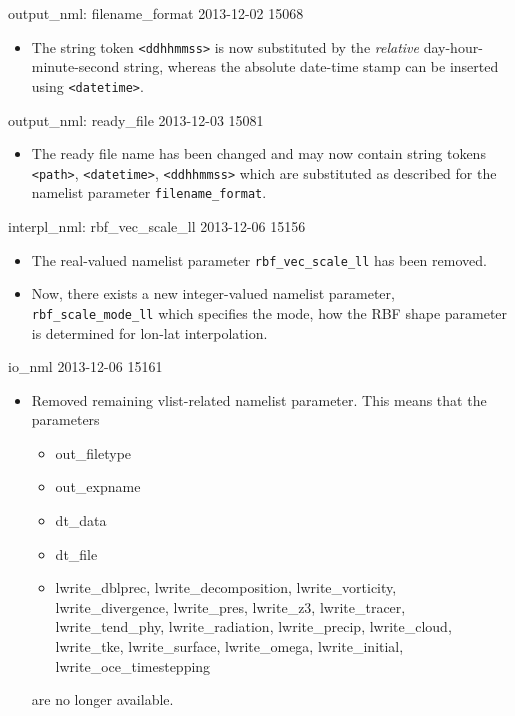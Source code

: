 \begin{changeitem}{output\_nml: filename\_format }{ 2013-12-02 }{ 15068 }
  \begin{itemize}
   \item The string token \texttt{<ddhhmmss>} is now substituted by the \emph{relative} day-hour-minute-second
         string, whereas the absolute date-time stamp can be inserted using \texttt{<datetime>}.
  \end{itemize}
\end{changeitem}

\begin{changeitem}{output\_nml: ready\_file }{ 2013-12-03 }{ 15081 }
  \begin{itemize}
   \item The ready file name has been changed and may now contain
     string tokens \texttt{<path>}, \texttt{<datetime>},
     \texttt{<ddhhmmss>} which are substituted as described for the
     namelist parameter \texttt{filename\_format}.
  \end{itemize}
\end{changeitem}

\begin{changeitem}{interpl\_nml: rbf\_vec\_scale\_ll }{ 2013-12-06 }{ 15156 }
  \begin{itemize}
   \item The real-valued namelist parameter \texttt{rbf\_vec\_scale\_ll} has been removed.
   \item Now, there exists a new integer-valued namelist parameter, \texttt{rbf\_scale\_mode\_ll}
         which specifies the mode, how the RBF shape parameter is
         determined for lon-lat interpolation.
  \end{itemize}
\end{changeitem}

\begin{changeitem}{io\_nml }{ 2013-12-06 }{ 15161 }
  \begin{itemize}
   \item Removed remaining vlist-related namelist parameter. This means that the parameters
         \begin{itemize}
            \item out\_filetype
            \item out\_expname
            \item dt\_data
            \item dt\_file
            \item lwrite\_dblprec, lwrite\_decomposition, lwrite\_vorticity, lwrite\_divergence, lwrite\_pres, 
                  lwrite\_z3, lwrite\_tracer, lwrite\_tend\_phy, lwrite\_radiation, lwrite\_precip, lwrite\_cloud, 
                  lwrite\_tke, lwrite\_surface, lwrite\_omega, lwrite\_initial, lwrite\_oce\_timestepping
         \end{itemize}
         are no longer available.
  \end{itemize}
\end{changeitem}


